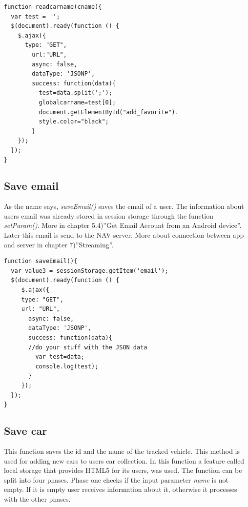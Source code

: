 
\begin{lstlisting}[language=html, caption= 
Read car name function,captionpos=b]
function readcarname(cname){
  var test = '';
  $(document).ready(function () {
    $.ajax({
      type: "GET",
        url:"URL",
        async: false,
        dataType: 'JSONP',
        success: function(data){
          test=data.split(';');
          globalcarname=test[0];
          document.getElementById("add_favorite").
          style.color="black";
        }
    });
  });
}
\end{lstlisting}

\subsection{Save email}
As the name says, \textit{saveEmail()} saves the email of a user. The information about users email was already stored in session storage through the function \textit{setParam()}. More in chapter 5.4)''Get Email Account from an Android device''.\\

Later this email is send to the NAV server. More about connection between app and server in chapter 7)''Streaming''.
\\

\begin{lstlisting}[language=html, caption= 
Save email function,captionpos=b]
function saveEmail(){    
  var value3 = sessionStorage.getItem('email');
  $(document).ready(function () {
     $.ajax({
     type: "GET",
     url: "URL",
       async: false,
       dataType: 'JSONP',
       success: function(data){
       //do your stuff with the JSON data
         var test=data;
         console.log(test);
       }
     });
  });
}
\end{lstlisting}

\subsection{Save car}
This function saves the id and the name of the tracked vehicle. This method is used for adding new cars to users car collection. In this function a feature called local storage that provides HTML5 for its users, was used. The function can be split into four phases.
\newpage
Phase one checks if the input parameter \textit{name} is not empty. If it is empty user receives information about it, otherwise it processes with the other phases.

